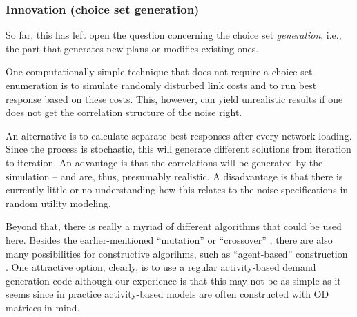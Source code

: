 \subsubsection{Innovation (choice set generation)}

So far, this has left open the question concerning the choice set
\emph{generation}, i.e., the part that generates new plans or modifies
existing ones.  

One computationally simple technique that does not require a choice
set enumeration is to simulate randomly disturbed link costs and to
run best response based on these costs. This, however, can yield
unrealistic results if one does not get the correlation structure of
the noise right.

An alternative is to calculate separate best responses after every
network loading.  Since the process is stochastic, this will generate
different solutions from iteration to iteration.  An advantage is that
the correlations will be generated by the simulation -- and are, thus,
presumably realistic.  A disadvantage is that there is currently
little or no understanding how this relates to the noise
specifications in random utility modeling.

Beyond that, there is really a myriad of different algorithms that
could be used here.  Besides the earlier-mentioned ``mutation''
\citep{BalmerRaneyEtAl2005act-times} or ``crossover''
\citep{CharyparNagel2005ga4acts,MeisterBalmerEtc2006planomatIatbr},
there are also many possibilities for constructive algorihms, such as
``agent-based'' construction
\citep{ZhuLevinsonZhang2008AgentBasedRouteChoice2}.  One attractive
option, clearly, is to use a regular activity-based demand generation
code \citep[e.g.,][]{BowmanEtc1999PortlandActs,MillerRoordaTASHA}
although our experience is that this may not be as simple as it seems
\citep{RieserNagelEtc2007early-berlin-trr} since in practice
activity-based models are often constructed with OD matrices in mind.




